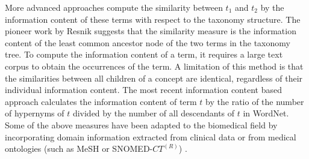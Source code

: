 More advanced approaches \cite{Resnik:1995, Jiang:1997, Lin:1998, Seco:2004, Snchez:2011} compute the similarity between $t_1$ and $t_2$ by the
information content of these terms with respect to the taxonomy structure. The pioneer work by Resnik \cite{Resnik:1995} suggests that the
similarity measure is the information content of the least common ancestor node of the two terms in the taxonomy tree.
To compute the information content of a term, it requires a large text corpus
to obtain the occurrences of the term.
A limitation of this method is that the similarities between all children of
a concept are identical, regardless of their individual information content.
The most recent information content based approach \cite{Snchez:2011} calculates
the information content of term $t$ by the ratio of
the number of hypernyms of $t$ divided by the number of all descendants of $t$ in WordNet.
Some of the above measures have been adapted to the biomedical field by incorporating domain information extracted from clinical data or from medical ontologies (such as MeSH or SNOMED-$CT^{(R)}$) \cite{Pedersen:2007, Batet:2011}.


